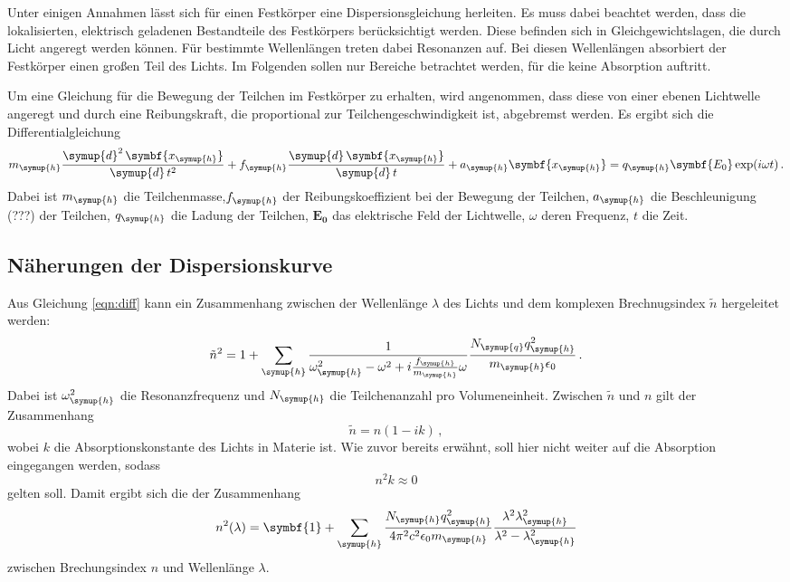 Unter einigen Annahmen lässt sich für einen Festkörper eine Dispersionsgleichung
herleiten. Es muss dabei beachtet werden, dass die lokalisierten, elektrisch geladenen
Bestandteile des Festkörpers berücksichtigt werden. Diese befinden sich in Gleichgewichtslagen,
die durch Licht angeregt werden können. Für bestimmte Wellenlängen treten dabei
Resonanzen auf. Bei diesen Wellenlängen absorbiert der Festkörper einen großen Teil
des Lichts. Im Folgenden sollen nur Bereiche betrachtet werden, für die keine
Absorption auftritt.

Um eine Gleichung für die Bewegung der Teilchen im Festkörper zu erhalten, wird
angenommen, dass diese von einer ebenen Lichtwelle angeregt und durch eine Reibungskraft,
die proportional zur Teilchengeschwindigkeit ist, abgebremst werden. Es ergibt sich
die Differentialgleichung
\begin{equation}
  m_{\symup{h}}\frac{\symup{d}^2\,\symbf{x_{\symup{h}}}}{\symup{d}\,t^2}
  +f_{\symup{h}}\frac{\symup{d}\,\symbf{x_{\symup{h}}}}{\symup{d}\,t}
  +a_{\symup{h}}\symbf{x_{\symup{h}}}=q_{\symup{h}}\symbf{E_0}\exp(i \omega t)\,.
  \label{eqn:diff}
\end{equation}
Dabei ist $m_{\symup{h}}$ die Teilchenmasse,$f_{\symup{h}}$ der Reibungskoeffizient
bei der Bewegung der Teilchen, $a_{\symup{h}}$ die Beschleunigung (???) der Teilchen,
$q_{\symup{h}}$ die Ladung der Teilchen, $\symbf{E_0}$ das elektrische Feld der Lichtwelle,
$\omega$ deren Frequenz, $t$ die Zeit.

\subsection{Näherungen der Dispersionskurve}
\label{subsec:dispersion2}

Aus Gleichung \eqref{eqn:diff} kann ein Zusammenhang zwischen der Wellenlänge $\lambda$ des
Lichts und dem komplexen Brechnugsindex $\tilde{n}$ hergeleitet werden:
\begin{equation}
  \tilde{n}^2=1+\sum_{\symup{h}}\frac{1}{\omega_{\symup{h}}^2-\omega^2
  +i\frac{f_{\symup{h}}}{m_{\symup{h}}}\omega} \frac{N_{\symup{q}} q_{\symup{h}}^2}
  {m_{\symup{h}} \epsilon_0} \,.
\end{equation}
Dabei ist $\omega_{\symup{h}}^2$ die Resonanzfrequenz und $N_{\symup{h}}$ die
Teilchenanzahl pro Volumeneinheit. Zwischen $\tilde{n}$ und $n$ gilt der Zusammenhang
\begin{equation}
  \tilde{n}=n(1-ik)\,,
\end{equation}
wobei $k$ die Absorptionskonstante des Lichts in Materie ist. Wie zuvor bereits erwähnt,
soll hier nicht weiter auf die Absorption eingegangen werden, sodass
\begin{equation}
  n^2k\approx0
\end{equation}
gelten soll. Damit ergibt sich die der Zusammenhang
\begin{equation}
  {n}^2 (\lambda) = \symbf{1}+\sum_{\symup{h}} \frac{N_{\symup{h}}q_{\symup{h}}^2}
  {4 \pi^2 c^2 \epsilon_0 m_{\symup{h}}}
  \frac{\lambda^2 \lambda_{\symup{h}}^2}{\lambda^2-\lambda_{\symup{h}}^2}
  \label{eqn:dispersion}
\end{equation}
zwischen Brechungsindex $n$ und Wellenlänge $\lambda$.

